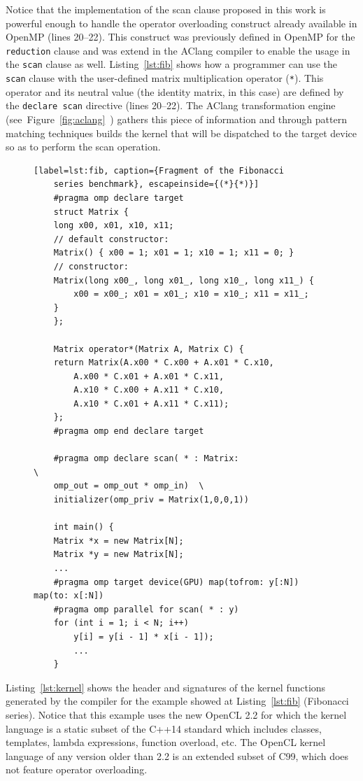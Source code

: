 \documentclass[Ingles]{ic-tese-v1}
\newcommand{\rfig}[1]{Figure~\ref{fig:#1}}
\newcommand{\ttt}[1]{{\texttt{#1}}}
\newcommand{\rlst}[1]{Listing~\ref{lst:#1}}
\begin{document}
Notice that the implementation
of the  scan clause  proposed in  this work  is powerful  enough to
handle  the operator  overloading  construct  already available  in
OpenMP (lines  20--22). This construct was  previously defined in
OpenMP for the \ttt{reduction} clause  and was extend in the AClang
compiler  to enable  the usage  in  the \ttt{scan}  clause as  well.
\rlst{fib} shows how a  programmer can use the \ttt{scan}
clause   with  the   user-defined  matrix   multiplication  operator
(\ttt{*}).   This  operator  and  its neutral  value  (the  identity
matrix,  in  this  case)  are  defined  by  the  \ttt{declare  scan}
directive   (lines  20--22).    The  AClang   transformation  engine
(see~\rfig{aclang}~) gathers  this piece  of information
and through pattern matching techniques  builds the kernel that will
be  dispatched to  the  target  device so  as  to  perform the  scan
operation.

\begin{figure}[t]
	\lstset{basicstyle=\scriptsize}
	\begin{lstlisting}[label=lst:fib, caption={Fragment of the Fibonacci
	series benchmark}, escapeinside={(*}{*)}]
	#pragma omp declare target
	struct Matrix {
	long x00, x01, x10, x11;
	// default constructor:
	Matrix() { x00 = 1; x01 = 1; x10 = 1; x11 = 0; }
	// constructor:
	Matrix(long x00_, long x01_, long x10_, long x11_) {
		x00 = x00_; x01 = x01_; x10 = x10_; x11 = x11_;
	}
	};
	
	Matrix operator*(Matrix A, Matrix C) {
	return Matrix(A.x00 * C.x00 + A.x01 * C.x10,
		A.x00 * C.x01 + A.x01 * C.x11,
		A.x10 * C.x00 + A.x11 * C.x10,
		A.x10 * C.x01 + A.x11 * C.x11);
	};
	#pragma omp end declare target
	
	#pragma omp declare scan( * : Matrix:                     \ 
	omp_out = omp_out * omp_in)  \
	initializer(omp_priv = Matrix(1,0,0,1))
	
	int main() {
	Matrix *x = new Matrix[N];
	Matrix *y = new Matrix[N];
	...
	#pragma omp target device(GPU) map(tofrom: y[:N]) map(to: x[:N])
	#pragma omp parallel for scan( * : y)
	for (int i = 1; i < N; i++)
		y[i] = y[i - 1] * x[i - 1]);
		...
	}
	\end{lstlisting}
\end{figure}

\rlst{kernel} shows the header and signatures of the kernel
functions  generated  by  the  compiler  for  the  example  showed  at
\rlst{fib} (Fibonacci  series). Notice that this
example uses the new OpenCL 2.2 for which  the kernel language is a
static subset of the C++14 standard  which includes classes, templates,
lambda  expressions,  function  overload, etc.  The  OpenCL  kernel
language of any version older than  2.2 is an extended subset of
C99,  which does not feature  operator overloading.  
\end{document}

